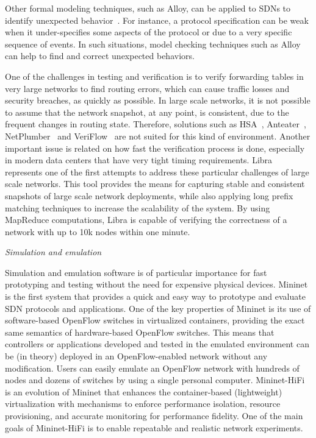 Other formal modeling techniques, such as Alloy, can be applied to SDNs to identify unexpected 
behavior~\cite{ruchansky2013}. For instance, a protocol specification can be weak 
when it under-specifies some aspects of the protocol or due to a very specific sequence of events.
In such situations, model checking techniques such as Alloy can help to find and correct unexpected 
behaviors.

One of the challenges in testing and verification is to verify forwarding tables in very large networks to find routing errors, which can cause traffic losses and security breaches, as quickly as possible.
In large scale networks, it is not possible to assume that the network snapshot, at any point, is consistent, 
due to the frequent changes in routing state.
Therefore, solutions such as HSA~\cite{kazemian2012}, Anteater~\cite{mai2011}, NetPlumber~\cite{kazemian2013} and VeriFlow~\cite{khurshid2012} are not suited for this kind of environment.
Another important issue is related on how fast the verification process is done, especially in modern data centers
that have very tight timing requirements. Libra~\cite{zeng2014} represents one of the first attempts to address 
these particular challenges of large scale networks. 
This tool provides the means for capturing stable and consistent 
snapshots of large scale network deployments, while also applying long prefix matching techniques 
to increase the scalability of the system.
By using MapReduce computations, Libra is capable of verifying the correctness of a 
network with up to 10k nodes within one minute.

\vspace{2mm}
\noindent \textit{Simulation and emulation}

Simulation and emulation software is of particular importance for fast prototyping and testing without the need for expensive physical devices.
Mininet~\cite{lantz2010} is the first system that provides a quick and 
easy way to prototype and evaluate SDN protocols and applications.
One of the key properties of Mininet 
is its use of software-based OpenFlow switches in virtualized containers, providing the exact same semantics of hardware-based OpenFlow  switches. This means that controllers or applications developed and tested in the emulated environment can be (in theory) deployed in an OpenFlow-enabled network without any modification. Users can easily emulate an OpenFlow network with hundreds of nodes and dozens of switches by using a single personal computer.
Mininet-HiFi~\cite{handigol2012} is an evolution of Mininet that enhances the container-based (lightweight) 
virtualization with mechanisms to enforce performance isolation, resource provisioning, and accurate monitoring for 
performance fidelity. 
One of the main goals of Mininet-HiFi is to enable repeatable and realistic network experiments.

